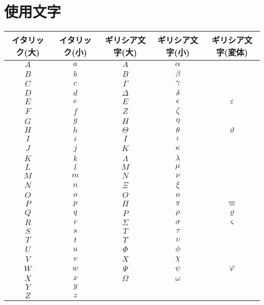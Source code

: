 \section{使用文字}
	\begin{table}[htb]
		\begin{tabular}{|c|c|c|c|c|} \hline
			イタリック(大) & イタリック(小) & ギリシア文字(大) & ギリシア文字(小) & ギリシア文字(変体) \\ \hline \hline
			$A$ & $a$ & $A$ & $\alpha$ & \\ \hline
			$B$ & $b$ & $B$ & $\beta$ & \\ \hline
			$C$ & $c$ & $\Gamma$ & $\gamma$ & \\ \hline
			$D$ & $d$ & $\Delta$ & $\delta$ & \\ \hline
			$E$ & $e$ & $E$ & $\epsilon$ & $\varepsilon$ \\ \hline
			$F$ & $f$ & $Z$ & $\zeta$ & \\ \hline
			$G$ & $g$ & $H$ & $\eta$ & \\ \hline
			$H$ & $h$ & $\Theta$ & $\theta$ & $\vartheta$ \\ \hline
			$I$ & $i$ & $I$ & $\iota$ & \\ \hline
			$J$ & $j$ & $K$ & $\kappa$ & \\ \hline
			$K$ & $k$ & $\Lambda$ & $\lambda$ & \\ \hline
			$L$ & $l$ & $M$ & $\mu$ & \\ \hline
			$M$ & $m$ & $N$ & $\nu$ & \\ \hline
			$N$ & $n$ & $\Xi$ & $\xi$ & \\ \hline
			$O$ & $o$ & $O$ & $o$ & \\ \hline
			$P$ & $p$ & $\Pi$ & $\pi$ & $\varpi$ \\ \hline
			$Q$ & $q$ & $P$ & $\rho$ & $\varrho$ \\ \hline
			$R$ & $r$ & $\Sigma$ & $\sigma$ & $\varsigma$ \\ \hline
			$S$ & $s$ & $T$ & $\tau$ & \\ \hline
			$T$ & $t$ & $\Upsilon$ & $\upsilon$ & \\ \hline
			$U$ & $u$ & $\Phi$ & $\phi$ & \\ \hline
			$V$ & $v$ & $X$ & $\chi$ & \\ \hline
			$W$ & $w$ & $\Psi$ & $\psi$ & $\varphi$ \\ \hline
			$X$ & $x$ & $\Omega$ & $\omega$ & \\ \hline
			$Y$ & $y$ & & & \\ \hline
			$Z$ & $z$ & & & \\ \hline
		\end{tabular}
		\label{tab:alphabet}
	\end{table}
